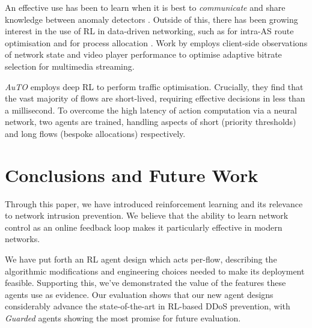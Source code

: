 \documentclass[10pt, times, conference, letterpaper]{IEEEtran}
\begin{document}
An effective use has been to learn when it is best to \emph{communicate} and share knowledge between anomaly detectors \cite{DBLP:conf/paisi/XuSH07}.
Outside of this, there has been growing interest in the use of RL in data-driven networking, such as for intra-AS route optimisation \cite{DBLP:conf/hotnets/ValadarskySST17} and for process allocation \cite{DBLP:conf/hotnets/MaoAMK16}.
Work by \textcite{DBLP:conf/sigcomm/MaoNA17} employs client-side observations of network state and video player performance to optimise adaptive bitrate selection for multimedia streaming.

\emph{AuTO} \cite{DBLP:conf/sigcomm/ChenL0L18} employs deep RL to perform traffic optimisation.
Crucially, they find that the vast majority of flows are short-lived, requiring effective decisions in less than a millisecond.
To overcome the high latency of action computation via a neural network, two agents are trained, handling aspects of short (priority thresholds) and long flows (bespoke allocations) respectively.


\section{Conclusions and Future Work}
Through this paper, we have introduced reinforcement learning and its relevance to network intrusion prevention.
We believe that the ability to learn network control as an online feedback loop makes it particularly effective in modern networks.

We have put forth an RL agent design which acts per-flow, describing the algorithmic modifications and engineering choices needed to make its deployment feasible.
Supporting this, we've demonstrated the value of the features these agents use as evidence.
Our evaluation shows that our new agent designs considerably advance the state-of-the-art in RL-based DDoS prevention, with \emph{Guarded} agents showing the most promise for future evaluation.
\end{document}
